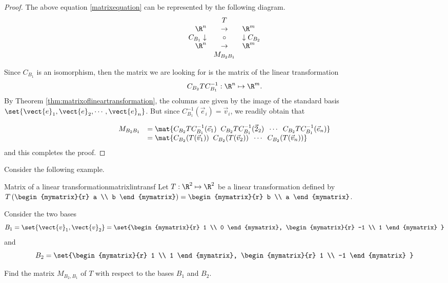 \begin{proof}
The above equation \ref{matrixequation} can be represented by the following diagram.
\begin{equation*}
\begin{array}{rrcll}
&  & T &  &  \\
& \R^n & \rightarrow  & \R^m & \\
& C_{B_{1} }\downarrow  & \circ  & \downarrow C_{B_{2} } &  \\
& \R^{n} & \rightarrow  & \R^{m} &  \\
&  & M_{B_{2} B_{1} } &  &
\end{array}
\end{equation*}

Since $C_{B_1}$ is an isomorphism, then the matrix we are looking for is the matrix of the linear transformation 
\[   C_{B_2} T C^{-1}_{B_1} : \R^n \mapsto \R^m. \]
By Theorem \ref{thm:matrixoflineartransformation}, the columns are
given by the image of the standard basis $\set{\vect{e}_1,
\vect{e}_2, \cdots, \vect{e}_n }$. But since $C^{-1}_{B_1}( \vec{e}_i) = \vec{v}_i$, we readily obtain that 

\[ \begin{array}{ll} 
M_{B_{2} B_{1}} 
& = \mat{C_{B_2}T C^{-1}_{B_1} (\vec{e}_1) \;\; C_{B_2}T C^{-1}_{B_1} (\vec{2}_2) \;\; \cdots \;\; C_{B_2}T C^{-1}_{B_1} (\vec{e}_n) } \\
& = \mat{C_{B_2}(T(\vec{v}_1)) \;\; C_{B_2}(T(\vec{v}_2)) \;\; \cdots \;\; C_{B_2}(T(\vec{v}_n)) } 
\end{array}\]
and this completes the proof. 
\end{proof}

Consider the following example.

\begin{example}{Matrix of a linear transformation}{matrixlintransf}
Let $T: \R^2 \mapsto \R^2$ be a linear transformation defined by $T \left( \begin{mymatrix}{r}
a \\
b
\end{mymatrix} \right) = \begin{mymatrix}{r}
b \\
a 
\end{mymatrix}$. 

Consider the two bases
\[
B_1 = \set{\vect{v}_{1}, \vect{v}_{2} } = \set{\begin{mymatrix}{r}
1 \\
0
\end{mymatrix}, \begin{mymatrix}{r}
-1 \\
1
\end{mymatrix}
}
\]
 and 
\[
B_2 = \set{\begin{mymatrix}{r}
1 \\
1
\end{mymatrix}, \begin{mymatrix}{r}
1 \\
-1
\end{mymatrix}
}
\]

Find the matrix $M_{B_2,B_1}$ of $T$ with respect to the bases $B_1$ and $B_2$. 
\end{example}


